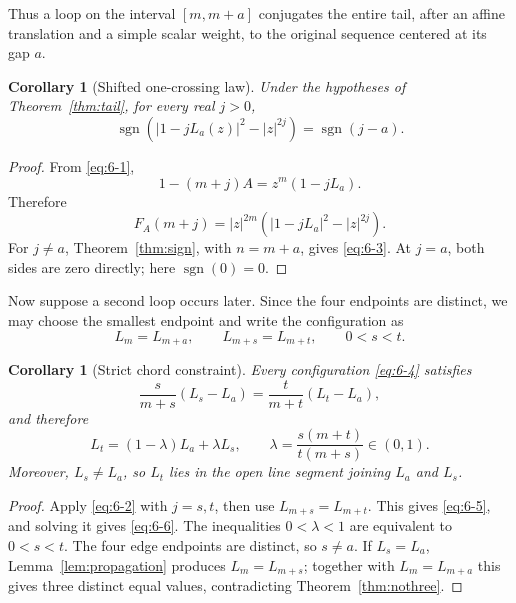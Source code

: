 \documentclass[11pt]{article}
\numberwithin{equation}{section}
\newtheorem{corollary}[theorem]{Corollary}
\theoremstyle{definition}
\begin{document}
Thus a loop on the interval \([m,m+a]\) conjugates the entire tail, after an
affine translation and a simple scalar weight, to the original sequence
centered at its gap \(a\).

\begin{corollary}[Shifted one-crossing law]\label{cor:shiftedsign}
Under the hypotheses of Theorem~\ref{thm:tail}, for every real \(j>0\),
\begin{equation}
 \operatorname{sgn}
 \left(|1-jL_a(z)|^2-|z|^{2j}\right)
 =\operatorname{sgn}(j-a).
 \label{eq:6-3}
\end{equation}
\end{corollary}

\begin{proof}
From \eqref{eq:6-1},
\[
 1-(m+j)A=z^m(1-jL_a).
\]
Therefore
\[
 F_A(m+j)=|z|^{2m}
 \left(|1-jL_a|^2-|z|^{2j}\right).
\]
For \(j\neq a\), Theorem~\ref{thm:sign}, with \(n=m+a\), gives
\eqref{eq:6-3}.  At \(j=a\), both sides are zero directly; here
\(\operatorname{sgn}(0)=0\).
\end{proof}

Now suppose a second loop occurs later.  Since the four endpoints are distinct,
we may choose the smallest endpoint and write the configuration as
\begin{equation}
 L_m=L_{m+a},
 \qquad
 L_{m+s}=L_{m+t},
 \qquad 0<s<t.
 \label{eq:6-4}
\end{equation}

\begin{corollary}[Strict chord constraint]\label{cor:chord}
Every configuration \eqref{eq:6-4} satisfies
\begin{equation}
 \frac{s}{m+s}(L_s-L_a)
 =\frac{t}{m+t}(L_t-L_a),
 \label{eq:6-5}
\end{equation}
and therefore
\begin{equation}
 L_t=(1-\lambda)L_a+\lambda L_s,
 \qquad
 \lambda=\frac{s(m+t)}{t(m+s)}\in(0,1).
 \label{eq:6-6}
\end{equation}
Moreover, \(L_s\neq L_a\), so \(L_t\) lies in the open line segment joining
\(L_a\) and \(L_s\).
\end{corollary}

\begin{proof}
Apply \eqref{eq:6-2} with \(j=s,t\), then use
\(L_{m+s}=L_{m+t}\).  This gives \eqref{eq:6-5}, and solving it gives
\eqref{eq:6-6}.  The inequalities \(0<\lambda<1\) are equivalent to \(0<s<t\).
The four edge endpoints are distinct, so \(s\neq a\).  If
\(L_s=L_a\), Lemma~\ref{lem:propagation} produces
\(L_m=L_{m+s}\); together with \(L_m=L_{m+a}\) this gives three
distinct equal values, contradicting Theorem~\ref{thm:nothree}.
\end{proof}
\end{document}
